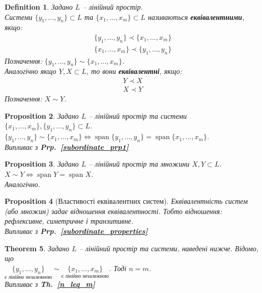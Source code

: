 \documentclass[a4paper, 10pt]{article}
\theoremstyle{theoremdd}
\newtheorem{theorem}{Theorem}[subsection]
\newtheorem{definition}[theorem]{Definition}
\newtheorem{proposition}[theorem]{Proposition}
\newcommand\thref[1]{\textbf{Th.~\ref{#1}}}
\newcommand\prpref[1]{\textbf{Prp.~\ref{#1}}}
\DeclareMathOperator{\linspan}{span}
\begin{document}
	\begin{definition}
	Задано $L$ -- лінійний простір.\\
	Системи $\{y_1, \dots, y_n \} \subset L$ та $\{x_1, \dots, x_m \} \subset L$ називаються \textbf{еквівалентними}, якщо:
	\begin{align*}
	\{y_1, \dots, y_n \} \prec \{x_1, \dots, x_m \} \\
	\{x_1, \dots, x_m \} \prec \{y_1, \dots, y_n \}
	\end{align*}
	Позначення: $\{y_1, \dots, y_n \} \sim \{x_1, \dots, x_m \}$.\\
	Аналогічно якщо $Y,X \subset L$, то вони \textbf{еквівалентні}, якщо:
	\begin{align*}
	Y \prec X \\
	X \prec Y
	\end{align*}
	Позначення: $X \sim Y$.
	\end{definition}
	
	\begin{proposition}
	Задано $L$ -- лінійний простір та системи $\{x_1,\dots,x_m\}, \{y_1,\dots,y_n\} \subset L$.\\
	$\{y_1, \dots, y_n \} \sim \{x_1, \dots, x_m \} \iff \linspan \{y_1, \dots, y_n\} = \linspan \{x_1, \dots, x_m \}$.\\
	\textit{Випливає з} \prpref{subordinate_prp1}
	\end{proposition}
	
	\begin{proposition}
	Задано $L$ -- лінійний простір та множини $X,Y \subset L$.\\
	$X \sim Y \iff \linspan Y = \linspan X$.\\
	\textit{Аналогічно.}
	\end{proposition}
	
	\begin{proposition}[Властивості еквівалентних систем]
	Еквівалентність систем (або множин) задає відношення еквівалентності. Тобто відношення: рефлексивне, симетричне і транзитивне.\\
	\textit{Випливає з} \prpref{subordinate_properties}
	\end{proposition}
	
	\begin{theorem}
	\label{n_eq_m}
	Задано $L$ -- лінійний простір та системи, наведені нижче. Відомо, що \\ $\underset{\textrm{є лінійно незалежною}}{\{y_1, \dots, y_n \}} \sim \underset{\textrm{є лінійно незалежною}}{\{x_1, \dots, x_m \}} $. Тоді $n = m$.\\
	\textit{Випливає з} \thref{n_leq_m}
	\end{theorem}
	
\end{document}

